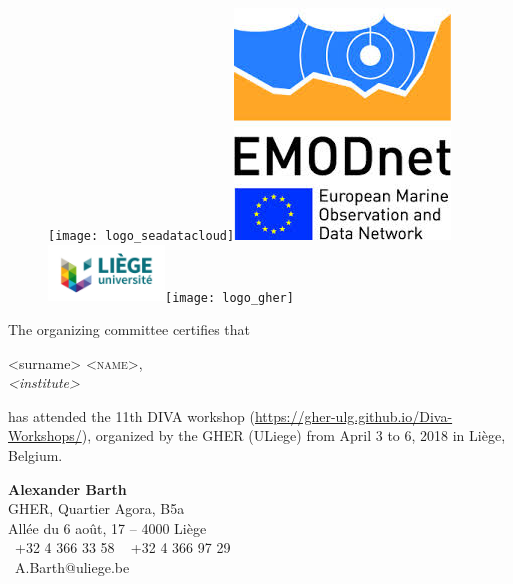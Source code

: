 \documentclass[12pt,svgnames,a4paper]{article}
\begin{document}
 
\thispagestyle{empty}
\large

\begin{figure}
\centering
\texttt{[image: logo\_seadatacloud]}\hspace*{.5cm}\includegraphics[width=.07\paperwidth]{logo_emodnet}\hspace*{.5cm}\includegraphics[height=1.5cm]{logo_uliege}\hspace*{.5cm}\texttt{[image: logo\_gher]}
\end{figure}


\vspace*{\fill}

 
The organizing committee certifies that

\vspace{1cm}

\begin{center}
\parbox{.8\textwidth}{
<surname> \textsc{<name>},\\
\textit{<institute>}
}
\end{center}

\vspace{1cm}

has attended the 11th \textsf{DIVA} workshop (\url{https://gher-ulg.github.io/Diva-Workshops/}), organized by the GHER (ULiege) from April 3 to 6, 2018 in Liège, Belgium.


\vspace{\fill}


\vspace*{1cm}


\begin{center}
\textbf{Alexander Barth}					\\
GHER, Quartier Agora, B5a							\\
All\'{e}e du 6 ao\^{u}t, 17 --  4000 Li\`{e}ge	 	\\
\Telefon~+32 4 366 33 58 \hspace{.5cm}  \Faxmachine~ +32 4 366 97 29 \\
\Letter~A.Barth@uliege.be
\end{center}
\end{document}
